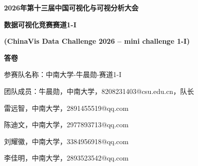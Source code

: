\documentclass[12pt, a4paper]{article}
\begin{document}
\thispagestyle{empty}

\begin{center}

{\fontsize{20bp}{26bp}\selectfont\bfseries
2026年第十三届中国可视化与可视分析大会}

\vspace{10pt}

{\fontsize{20bp}{26bp}\selectfont\bfseries
数据可视化竞赛\enspace 赛道1-I}

\vspace{11pt}

{\fontsize{13bp}{19bp}\ttmono\bfseries
(ChinaVis Data Challenge 2026 -- mini challenge 1-I)}

\vspace{11pt}

{\fontsize{20bp}{26bp}\selectfont\bfseries
答\quad 卷}

\end{center}

\vspace{2.0cm}


{\fontsize{13bp}{19bp}\heiti 参赛队名称：中南大学-牛晨勋-赛道1-I}

\vspace{28pt}

{\fontsize{13bp}{19bp}\heiti 团队成员：牛晨勋，中南大学，8208231403@csu.edu.cn，队长}

\vspace{16pt}
{\fontsize{13bp}{19bp}\heiti \phantom{团队成员：}雷远智，中南大学，2891455519@qq.com}

\vspace{16pt}
{\fontsize{13bp}{19bp}\heiti \phantom{团队成员：}陈迪文，中南大学，2977893713@qq.com}

\vspace{16pt}
{\fontsize{13bp}{19bp}\heiti \phantom{团队成员：}刘耀徽，中南大学，3384956918@qq.com}

\vspace{16pt}
{\fontsize{13bp}{19bp}\heiti \phantom{团队成员：}李佳明，中南大学，2893523542@qq.com}
\end{document}
